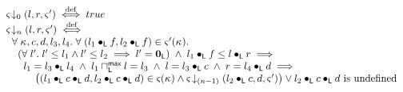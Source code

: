 \begin{definition}
\[\begin{array}{l}
	
	\extendsAMUpto{\amod{}}{0}{l}{r}{\amod{}'} \iffdef true \\ 
	
	\extendsAMUpto{\amod{}}{n}{l}{r}{\amod{}'} \iffdef \\ 

	\hspace*{0.2cm}\for{\ca{}, c, d, l_3, l_4}\for{(l_1 \composeL f, l_2 \composeL f) \in \amod{}'(\ca{})} \\
	\hspace*{0.4cm}\left(\for{l'} l' \leq l_1 \land l' \leq l_2 \implies l' = \unitL\right) \;\land\; l_1 \composeL f \leq  l \composeL r \implies\\
	\hspace*{0.6cm} l_1 = l_3 \composeL l_4 \;\land\; l_1 \maxMeetL l = l_3 \;\land\; l = l_3 \composeL c \;\land\; r = l_4 \composeL d\implies\\
	\hspace*{1cm} \left((l_1 \composeL c \composeL d, l_2 \composeL c \composeL d) \in \amod{}(\ca{}) \land
	\extendsAMUpto{\amod}{(n-1)}{l_2 \composeL c}{d}{\amod{}'}\right) \lor l_2 \composeL c \composeL d \text{ is undefined}\\\\
	
%	
%	
	

\end{array}\]
\end{definition}
